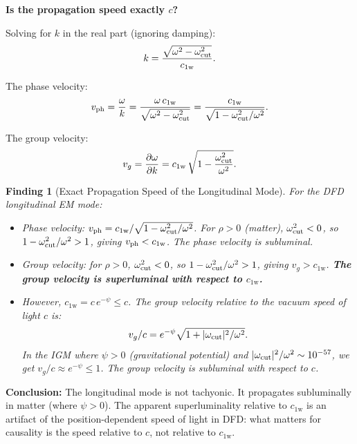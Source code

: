 \documentclass[11pt]{article}
\newtheorem{finding}{Finding}
\newcommand{\cfield}{c_{1\mathrm{w}}}
\begin{document}
\textbf{Is the propagation speed exactly $c$?}

Solving for $k$ in the real part (ignoring damping):
\begin{equation}
k = \frac{\sqrt{\omega^2 - \omega_{\rm cut}^2}}{\cfield}.
\end{equation}

The phase velocity:
\begin{equation}
v_{\rm ph} = \frac{\omega}{k} = \frac{\omega\,\cfield}{\sqrt{\omega^2 - \omega_{\rm cut}^2}}
= \frac{\cfield}{\sqrt{1 - \omega_{\rm cut}^2/\omega^2}}.
\end{equation}

The group velocity:
\begin{equation}
v_g = \frac{\partial\omega}{\partial k} = \cfield\,\sqrt{1 - \frac{\omega_{\rm cut}^2}{\omega^2}}.
\label{eq:vg-exact}
\end{equation}

\begin{finding}[Exact Propagation Speed of the Longitudinal Mode]
For the DFD longitudinal EM mode:
\begin{itemize}
\item Phase velocity: $v_{\rm ph} = \cfield/\sqrt{1 - \omega_{\rm cut}^2/\omega^2}$.
For $\rho > 0$ (matter), $\omega_{\rm cut}^2 < 0$, so
$1 - \omega_{\rm cut}^2/\omega^2 > 1$, giving
$v_{\rm ph} < \cfield$. The phase velocity is \textit{subluminal}.
\item Group velocity: for $\rho > 0$, $\omega_{\rm cut}^2 < 0$,
so $1 - \omega_{\rm cut}^2/\omega^2 > 1$, giving $v_g > \cfield$.
\textbf{The group velocity is superluminal with respect to $\cfield$.}
\item However, $\cfield = c\,e^{-\psi} \leq c$. The group velocity
relative to the vacuum speed of light $c$ is:
\begin{equation}
v_g / c = e^{-\psi}\sqrt{1 + |\omega_{\rm cut}|^2/\omega^2}.
\end{equation}
In the IGM where $\psi > 0$ (gravitational potential) and
$|\omega_{\rm cut}|^2/\omega^2 \sim 10^{-57}$, we get
$v_g/c \approx e^{-\psi} \leq 1$. The group velocity is
\textit{subluminal with respect to $c$}.
\end{itemize}
\end{finding}

\noindent \textbf{Conclusion:} The longitudinal mode is not tachyonic.
It propagates subluminally in matter (where $\psi > 0$). The apparent
superluminality relative to $\cfield$ is an artifact of the
position-dependent speed of light in DFD: what matters for causality
is the speed relative to $c$, not relative to $\cfield$.
\end{document}

